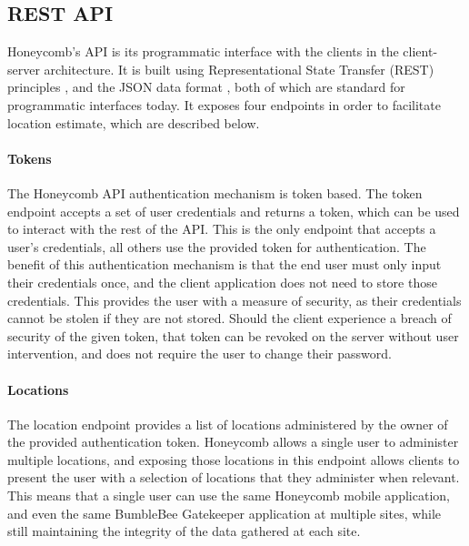 \subsection{REST API}
%


Honeycomb's API is its programmatic interface with the clients in the client-server architecture. It is built using Representational State Transfer (REST) principles \cite{fielding2002principled}, and the JSON data format \cite{json}, both of which are standard for programmatic interfaces today. It exposes four endpoints in order to facilitate location estimate, which are described below.


\paragraph{Tokens}
%

The Honeycomb API authentication mechanism is token based. The token endpoint accepts a set of user credentials and returns a token, which can be used to interact with the rest of the API. This is the only endpoint that accepts a user's credentials, all others use the provided token for authentication. The benefit of this authentication mechanism is that the end user must only input their credentials once, and the client application does not need to store those credentials. This provides the user with a measure of security, as their credentials cannot be stolen if they are not stored. Should the client experience a breach of security of the given token, that token can be revoked on the server without user intervention, and does not require the user to change their password. 


\paragraph{Locations}
%

The location endpoint provides a list of locations administered by the owner of the provided authentication token. Honeycomb allows a single user to administer multiple locations, and exposing those locations in this endpoint allows clients to present the user with a selection of locations that they administer when relevant. This means that a single user can use the same Honeycomb mobile application, and even the same BumbleBee Gatekeeper application at multiple sites, while still maintaining the integrity of the data gathered at each site. 


